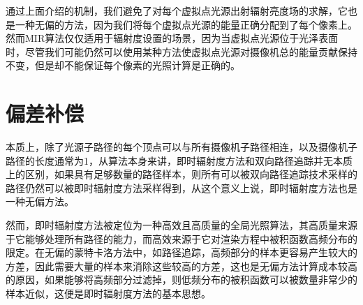 通过上面介绍的机制，我们避免了对每个虚拟点光源出射辐射亮度场的求解，它也是一种无偏的方法，因为我们将每个虚拟点光源的能量正确分配到了每个像素上。然而MIR算法仅仅适用于辐射度设置的场景，因为当虚拟点光源位于光泽表面时，尽管我们可能仍然可以使用某种方法使虚拟点光源对摄像机总的能量贡献保持不变，但是却不能保证每个像素的光照计算是正确的。

\section{偏差补偿}\label{sec:bias-compensation}
本质上，除了光源子路径的每个顶点可以与所有摄像机子路径相连，以及摄像机子路径的长度通常为1，从算法本身来讲，即时辐射度方法和双向路径追踪并无本质上的区别，如果具有足够数量的路径样本，则所有可以被双向路径追踪技术采样的路径仍然可以被即时辐射度方法采样得到，从这个意义上说，即时辐射度方法也是一种无偏方法。

然而，即时辐射度方法被定位为一种高效且高质量的全局光照算法，其高质量来源于它能够处理所有路径的能力，而高效来源于它对渲染方程中被积函数高频分布的限定。在无偏的蒙特卡洛方法中，如路径追踪，高频部分的样本更容易产生较大的方差，因此需要大量的样本来消除这些较高的方差，这也是无偏方法计算成本较高的原因，如果能够将高频部分过滤掉，则低频分布的被积函数可以被数量非常少的样本近似，这便是即时辐射度方法的基本思想。

